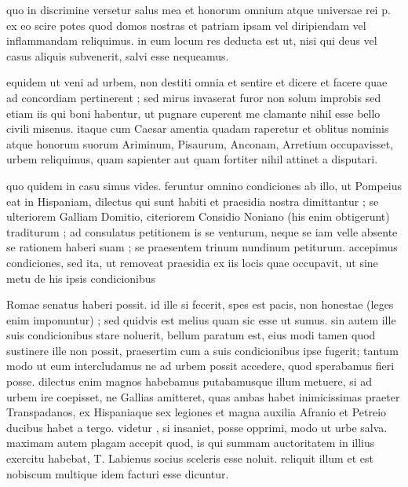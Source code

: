 


 quo in discrimine versetur salus mea et honorum omnium atque universae rei p. ex eo scire potes quod domos nostras et patriam ipsam vel diripiendam vel inflammandam reliquimus. in eum locum res deducta est ut, nisi qui deus vel casus aliquis subvenerit, salvi esse nequeamus.

 equidem ut veni ad urbem, non destiti omnia et sentire et dicere et facere quae ad concordiam pertinerent ; sed mirus invaserat furor non solum improbis sed etiam iis qui boni habentur, ut pugnare cuperent me clamante nihil esse bello civili misenus. itaque cum Caesar amentia quadam raperetur et oblitus nominis atque honorum suorum Ariminum, Pisaurum, Anconam, Arretium occupavisset, urbem reliquimus, quam sapienter aut quam fortiter nihil attinet a disputari.

 quo quidem in casu simus vides. feruntur omnino condiciones ab illo, ut Pompeius eat in Hispaniam, dilectus qui sunt habiti et praesidia nostra dimittantur ; se ulteriorem Galliam Domitio, citeriorem Considio Noniano (his enim obtigerunt) traditurum ; ad consulatus petitionem is se venturum, neque se iam velle absente se rationem haberi suam ; se praesentem trinum nundinum petiturum. accepimus condiciones, sed ita, ut removeat praesidia ex iis locis quae occupavit, ut sine metu de his ipsis condicionibus

 Romae senatus haberi possit. id ille si fecerit, spes est pacis, non honestae (leges enim imponuntur) ; sed quidvis est melius quam sic esse ut sumus. sin autem ille suis condicionibus stare noluerit, bellum paratum est, eius modi tamen quod sustinere ille non possit, praesertim cum a suis condicionibus ipse fugerit; tantum modo ut eum intercludamus ne ad urbem possit accedere, quod sperabamus fieri posse. dilectus enim magnos habebamus putabamusque illum metuere, si ad urbem ire coepisset, ne Gallias amitteret, quas ambas habet inimicissimas praeter Transpadanos, ex Hispaniaque sex legiones et magna auxilia Afranio et Petreio ducibus habet a tergo. videtur , si insaniet, posse opprimi, modo ut urbe salva. maximam autem plagam accepit quod, is qui summam auctoritatem in illius exercitu habebat, T. Labienus socius sceleris esse noluit. reliquit illum et est nobiscum multique idem facturi esse dicuntur.


